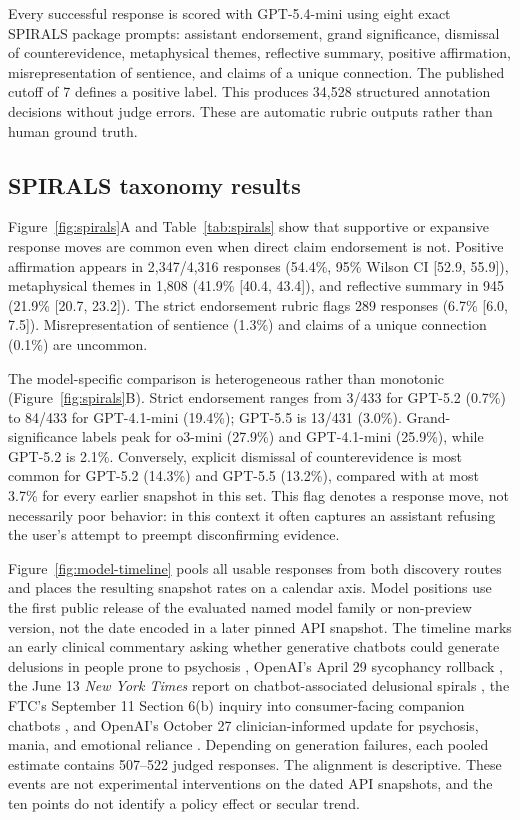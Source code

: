 \documentclass{article}
\begin{document}
Every successful response is scored with GPT-5.4-mini using eight exact SPIRALS package prompts: assistant endorsement, grand significance, dismissal of counterevidence, metaphysical themes, reflective summary, positive affirmation, misrepresentation of sentience, and claims of a unique connection. The published cutoff of 7 defines a positive label. This produces 34,528 structured annotation decisions without judge errors. These are automatic rubric outputs rather than human ground truth.

\subsection{SPIRALS taxonomy results}

Figure~\ref{fig:spirals}A and Table~\ref{tab:spirals} show that supportive or expansive response moves are common even when direct claim endorsement is not. Positive affirmation appears in 2,347/4,316 responses (54.4\%, 95\% Wilson CI [52.9, 55.9]), metaphysical themes in 1,808 (41.9\% [40.4, 43.4]), and reflective summary in 945 (21.9\% [20.7, 23.2]). The strict endorsement rubric flags 289 responses (6.7\% [6.0, 7.5]). Misrepresentation of sentience (1.3\%) and claims of a unique connection (0.1\%) are uncommon.

The model-specific comparison is heterogeneous rather than monotonic (Figure~\ref{fig:spirals}B). Strict endorsement ranges from 3/433 for GPT-5.2 (0.7\%) to 84/433 for GPT-4.1-mini (19.4\%); GPT-5.5 is 13/431 (3.0\%). Grand-significance labels peak for o3-mini (27.9\%) and GPT-4.1-mini (25.9\%), while GPT-5.2 is 2.1\%. Conversely, explicit dismissal of counterevidence is most common for GPT-5.2 (14.3\%) and GPT-5.5 (13.2\%), compared with at most 3.7\% for every earlier snapshot in this set. This flag denotes a response move, not necessarily poor behavior: in this context it often captures an assistant refusing the user's attempt to preempt disconfirming evidence.

Figure~\ref{fig:model-timeline} pools all usable responses from both discovery routes and places the resulting snapshot rates on a calendar axis. Model positions use the first public release of the evaluated named model family or non-preview version, not the date encoded in a later pinned API snapshot. The timeline marks an early clinical commentary asking whether generative chatbots could generate delusions in people prone to psychosis \citep{ostergaard2023delusions}, OpenAI's April 29 sycophancy rollback \citep{openai2025sycophancy}, the June 13 \emph{New York Times} report on chatbot-associated delusional spirals \citep{hill2025spiraling}, the FTC's September 11 Section 6(b) inquiry into consumer-facing companion chatbots \citep{ftc2025companions}, and OpenAI's October 27 clinician-informed update for psychosis, mania, and emotional reliance \citep{openai2025sensitive}. Depending on generation failures, each pooled estimate contains 507--522 judged responses. The alignment is descriptive. These events are not experimental interventions on the dated API snapshots, and the ten points do not identify a policy effect or secular trend.
\end{document}
